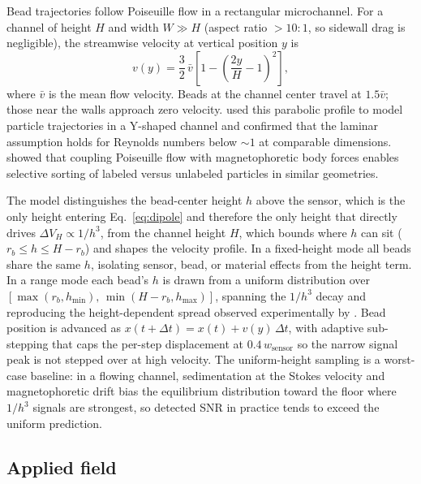 \documentclass[pdflatex,sn-basic]{sn-jnl}
\theoremstyle{thmstyleone}
\theoremstyle{thmstyletwo}
\theoremstyle{thmstylethree}
\begin{document}
Bead trajectories follow Poiseuille flow in a rectangular microchannel. For a channel of height $H$ and width $W \gg H$ (aspect ratio ${>}10{:}1$, so sidewall drag is negligible), the streamwise velocity at vertical position $y$ is
\begin{equation}
v(y) = \frac{3}{2}\,\bar{v}\left[1 - \left(\frac{2y}{H} - 1\right)^2\right],
\label{eq:poiseuille}
\end{equation}
where $\bar{v}$ is the mean flow velocity. Beads at the channel center travel at $1.5\bar{v}$; those near the walls approach zero velocity. \citet{hewlin2023} used this parabolic profile to model particle trajectories in a Y-shaped channel and confirmed that the laminar assumption holds for Reynolds numbers below ${\sim}1$ at comparable dimensions. \citet{khashan2024} showed that coupling Poiseuille flow with magnetophoretic body forces enables selective sorting of labeled versus unlabeled particles in similar geometries.

The model distinguishes the bead-center height $h$ above the sensor, which is the only height entering Eq.~\eqref{eq:dipole} and therefore the only height that directly drives $\Delta V_H \propto 1/h^3$, from the channel height $H$, which bounds where $h$ can sit ($r_b \le h \le H - r_b$) and shapes the velocity profile. In a fixed-height mode all beads share the same $h$, isolating sensor, bead, or material effects from the height term. In a range mode each bead's $h$ is drawn from a uniform distribution over $[\max(r_b, h_{\min}),\, \min(H - r_b, h_{\max})]$, spanning the $1/h^3$ decay and reproducing the height-dependent spread observed experimentally by \citet{aledealat2009}. Bead position is advanced as $x(t+\Delta t) = x(t) + v(y)\,\Delta t$, with adaptive sub-stepping that caps the per-step displacement at $0.4\, w_{\text{sensor}}$ so the narrow signal peak is not stepped over at high velocity. The uniform-height sampling is a worst-case baseline: in a flowing channel, sedimentation at the Stokes velocity and magnetophoretic drift bias the equilibrium distribution toward the floor where $1/h^3$ signals are strongest, so detected SNR in practice tends to exceed the uniform prediction.

\subsection{Applied field}\label{sec:halbach}
\end{document}

